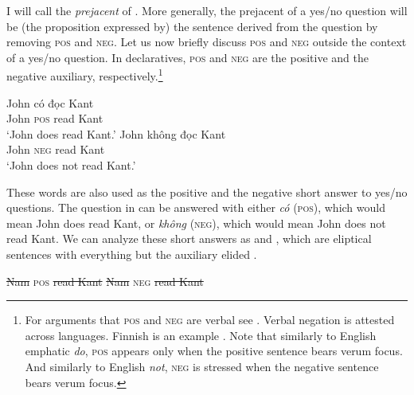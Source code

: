 \documentclass[output=paper,colorlinks,citecolor=brown]{langscibook}
\begin{document}
I will call  the \textit{prejacent} of . More generally, the prejacent of a yes/no question will be (the proposition expressed by) the sentence derived from the question by removing \textsc{pos} and \textsc{neg}. Let us now briefly discuss \textsc{pos} and \textsc{neg} outside the context of a yes/no question. In declaratives, \textsc{pos} and \textsc{neg} are the positive and the negative auxiliary, respectively.\footnote{For arguments that \textsc{pos} and \textsc{neg} are verbal see \citet{trinh2005aspects}. Verbal negation is attested across languages. Finnish is an example \citep{bobaljik1994what}. Note that similarly to English emphatic \textit{do}, \textsc{pos} appears only when the positive sentence bears verum focus. And similarly to English \textit{not}, \textsc{neg} is stressed when the negative sentence bears verum focus.}    %


\ea 
\ea
\gll John có đọc Kant\\
John \textsc{pos} read Kant\\
\glt `John does read Kant.'
\ex
\gll John không đọc Kant\\
John \textsc{neg} read Kant\\
\glt `John does not read Kant.'
\z
\z

These words are also used as the positive and the negative short answer to yes/no questions. The question in  can be answered with either \textit{có} (\textsc{pos}), which would mean John does read Kant, or \textit{không} (\textsc{neg}), which would mean John does not read Kant. We can analyze these short answers as  and , which are eliptical sentences with everything but the auxiliary elided \citep{holmberg2016syntax, krifka2013response}.

\ea
\ea \label{coshort}
\sout{Nam} \textsc{pos} \sout{read Kant}
\ex\label{khongshort}
\sout{Nam} \textsc{neg} \sout{read Kant}
\z
\z



\end{document}
